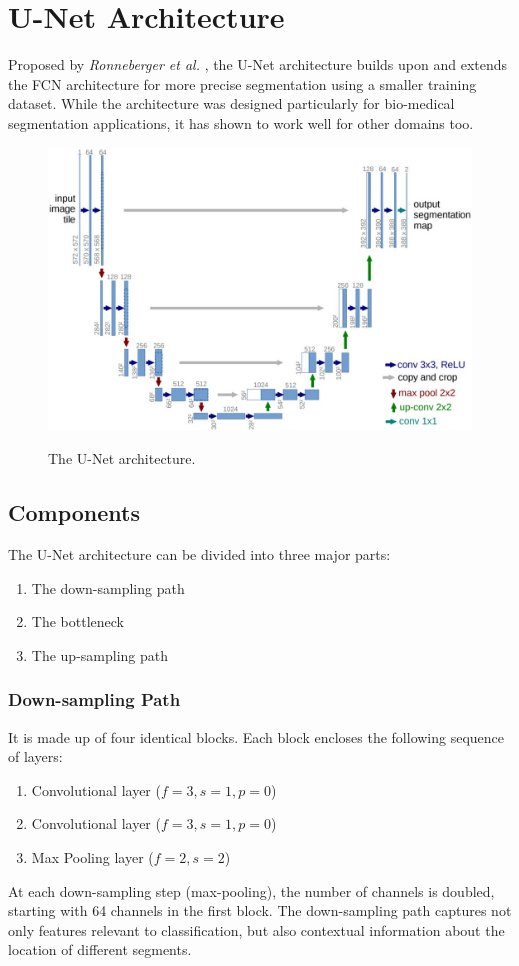 \documentclass[12pt, a4paper]{report}
\begin{document}
\section{U-Net Architecture}
Proposed by \textit{Ronneberger et al.} \cite{unet}, the U-Net architecture builds upon and extends the FCN architecture for more precise segmentation using a smaller training dataset. While the architecture was designed particularly for bio-medical segmentation applications, it has shown to work well for other domains too. %
\begin{figure}[h]
\centering
\includegraphics[width=\textwidth]{unet1.jpg}
\caption{The U-Net architecture.}
\cite{unet}
\end{figure}
\subsection{Components}
The U-Net architecture can be divided into three major parts:
\begin{enumerate}
	\item The down-sampling path
	\item The bottleneck
	\item The up-sampling path
\end{enumerate}
\subsubsection{Down-sampling Path}
It is made up of four identical blocks. Each block encloses the following sequence of layers:
\begin{enumerate}
	\item Convolutional layer ($f=3, s=1, p=0$)
	\item Convolutional layer ($f=3, s=1, p=0$)
	\item Max Pooling layer ($f=2, s=2$)
\end{enumerate}
At each down-sampling step (max-pooling), the number of channels is doubled, starting with 64 channels in the first block. The down-sampling path captures not only features relevant to classification, but also contextual information about the location of different segments.
\end{document}
